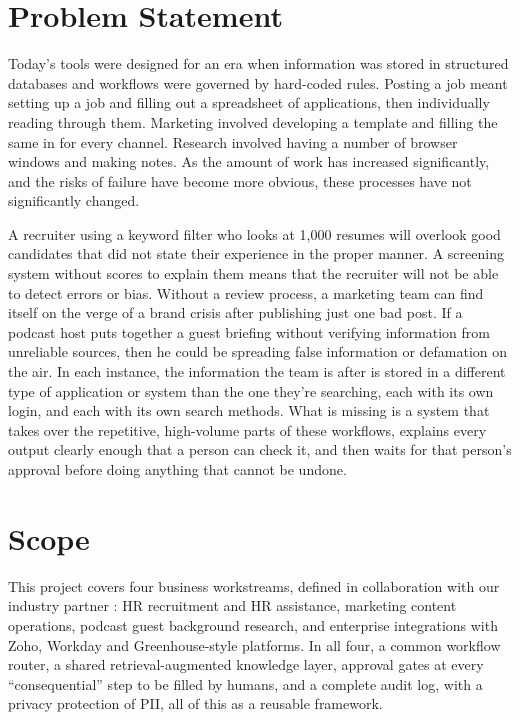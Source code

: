
\section{Problem Statement}
Today's tools were designed for an era when information was stored in structured databases and workflows were governed by hard-coded rules. Posting a job meant setting up a job and filling out a spreadsheet of applications, then individually reading through them. Marketing involved developing a template and filling the same in for every channel. Research involved having a number of browser windows and making notes. As the amount of work has increased significantly, and the risks of failure have become more obvious, these processes have not significantly changed.

A recruiter using a keyword filter who looks at 1,000 resumes will overlook good candidates that did not state their experience in the proper manner. A screening system without scores to explain them means that the recruiter will not be able to detect errors or bias. Without a review process, a marketing team can find itself on the verge of a brand crisis after publishing just one bad post. If a podcast host puts together a guest briefing without verifying information from unreliable sources, then he could be spreading false information or defamation on the air. In each instance, the information the team is after is stored in a different type of application or system than the one they're searching, each with its own login, and each with its own search methods.
What is missing is a system that takes over the repetitive, high-volume parts of these workflows, explains every output clearly enough that a person can check it, and then waits for that person's approval before doing anything that cannot be undone.

\section{Scope}
This project covers four business workstreams, defined in collaboration with our industry partner \Partner: HR recruitment and HR assistance, marketing content operations, podcast guest background research, and enterprise integrations with Zoho, Workday and Greenhouse-style platforms. In all four, a common workflow router, a shared retrieval-augmented knowledge layer, approval gates at every “consequential” step to be filled by humans, and a complete audit log, with a privacy protection of PII, all of this as a reusable framework.

